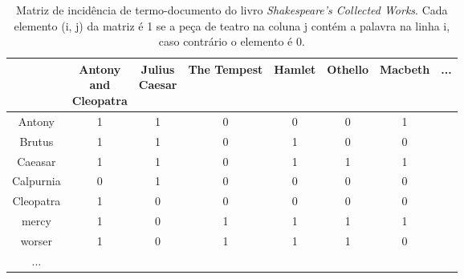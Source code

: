 \begin{table}[H]
    \centering
    \caption{Matriz de incidência de termo-documento do livro \textit{Shakespeare’s Collected Works}. Cada elemento (i, j) da matriz é 1 se a peça de teatro na coluna j contém a palavra na linha i, caso contrário o elemento é 0.}
    \begin{adjustbox}{max width=0.8\textwidth}
        \begin{tabular}{|c|c|c|c|c|c|c|c}
            \hline
            \diagbox{Palavra}{
                \raisebox{-1.27cm}{
                    \rotatebox{90}{
                        \parbox{1.6cm}{\centering Peça \\ de teatro}
                    }
                }
            } 
            & \makecell{Antony \\ and \\ Cleopatra} 
            & \makecell{Julius \\ Caesar} 
            & The Tempest 
            & Hamlet 
            & Othello 
            & Macbeth 
            & ... 
            \\ \hline
            Antony     & 1 & 1 & 0 & 0 & 0 & 1 & \\
            Brutus     & 1 & 1 & 0 & 1 & 0 & 0 & \\
            Caeasar    & 1 & 1 & 0 & 1 & 1 & 1 & \\
            Calpurnia  & 0 & 1 & 0 & 0 & 0 & 0 & \\
            Cleopatra  & 1 & 0 & 0 & 0 & 0 & 0 & \\
            mercy      & 1 & 0 & 1 & 1 & 1 & 1 & \\
            worser     & 1 & 0 & 1 & 1 & 1 & 0 & \\
            ...        & & & & & & & 
        \end{tabular}
    \end{adjustbox}
    \label{tab:matriz-incidência-termo-documento}
\end{table}